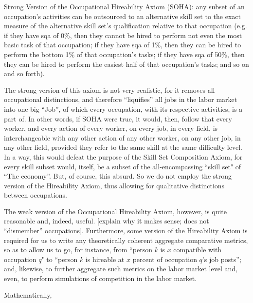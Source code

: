 \documentclass{elsarticle} %
\begin{document}
Strong Version of the Occupational Hireability Axiom (SOHA): any subset of an occupation's activities can be outsourced to an alternative skill set to the exact measure of the alternative skill set's qualification relative to that occupation (e.g. if they have sqa of 0\%, then they cannot be hired to perform not even the most basic task of that occupation; if they have sqa of 1\%, then they can be hired to perform the bottom 1\% of that occupation's tasks; if they have sqa of 50\%, then they can be hired to perform the easiest half of that occupation's tasks; and so on and so forth).

The strong version of this axiom is not very realistic, for it removes all occupational distinctions, and therefore ``liquifies'' all jobs in the labor market into one big ``Job'', of which every occupation, with its respective activities, is a part of. In other words, if SOHA were true, it would, then, follow that every worker, and every action of every worker, on every job, in every field, is interchangeable with any other action of any other worker, on any other job, in any other field, provided they refer to the same skill at the same difficulty level. In a way, this would defeat the purpose of the Skill Set Composition Axiom, for every skill subset would, itself, be a subset of the all-encompassing ``skill set" of ``The economy''. But, of course, this absurd. So we do not employ the strong version of the Hireability Axiom, thus allowing for qualitative distinctions between occupations.

The weak version of the Occupational Hireability Axiom, however, is quite reasonable and, indeed, useful. [explain why it makes sense; does not ``dismember'' occupations]. Furthermore, some version of the Hireability Axiom is required for us to write any theoretically coherent aggregate comparative metrics, so as to allow us to go, for instance, from ``person $k$ is $x$ compatible with occupation $q$" to ``person $k$ is hireable at $x$ percent of occupation $q$'s job posts''; and, likewise, to further aggregate such metrics on the labor market level and, even, to perform simulations of competition in the labor market.

Mathematically,
\end{document}
